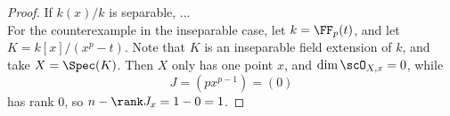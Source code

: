 \begin{proof}
	If $k(x)/k$ is separable, ... \\
	
	For the counterexample in the inseparable case, let $k = \FF_p(t)$, and let $K = k[x]/(x^p-t)$. Note that $K$ is an inseparable field extension of $k$, and take $X = \Spec(K)$. Then $X$ only has one point $x$, and $\dim \scO_{X,x} = 0$, while
	\[ J = (px^{p-1}) = (0) \]
	has rank 0, so $n - \rank J_x = 1-0 = 1$.
\end{proof}
